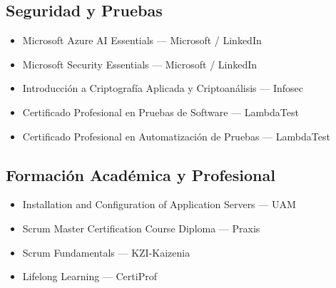 \subsection{Seguridad y Pruebas}
\begin{itemize}[leftmargin=12pt]
    \item Microsoft Azure AI Essentials — Microsoft / LinkedIn
    \item Microsoft Security Essentials — Microsoft / LinkedIn
    \item Introducción a Criptografía Aplicada y Criptoanálisis — Infosec
    \item Certificado Profesional en Pruebas de Software — LambdaTest
    \item Certificado Profesional en Automatización de Pruebas — LambdaTest
\end{itemize}

\subsection{Formación Académica y Profesional}
\begin{itemize}[leftmargin=12pt]
    \item Installation and Configuration of Application Servers — UAM
    \item Scrum Master Certification Course Diploma — Praxis
    \item Scrum Fundamentals — KZI-Kaizenia
    \item Lifelong Learning — CertiProf
\end{itemize}

